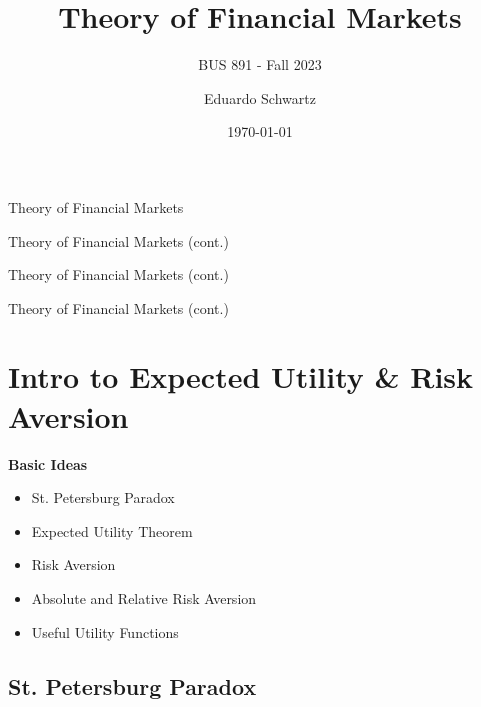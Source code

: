 \documentclass[
14pt,notheorems,hyperref={pdfauthor=whatever}
]{beamer}
\title[
]{Theory of Financial Markets}
\subtitle{BUS 891 - Fall 2023}
\author[
]{
    Eduardo Schwartz 
}
\institute{
    Ryan Beedie Chair in Finance, \\
    Simon Fraser University}
\date{\today}
\begin{document}
{
\begin{frame}
  \titlepage
\end{frame}
}
\addtocounter{framenumber}{-1}

\begin{frame}{Theory of Financial Markets}
    \setcounter{tocdepth}{2}
        \tableofcontents[sections={1-4}]
\end{frame}
\begin{frame}{Theory of Financial Markets (cont.)}
    \setcounter{tocdepth}{2}
        \tableofcontents[sections={5-9}]
\end{frame}
\begin{frame}{Theory of Financial Markets (cont.)}
    \setcounter{tocdepth}{2}
        \tableofcontents[sections={10-14}]
\end{frame}
\begin{frame}{Theory of Financial Markets (cont.)}
    \setcounter{tocdepth}{2}
        \tableofcontents[sections={15-20}]
        \vspace{166px}
\end{frame}

\section{Intro to Expected Utility \& Risk Aversion}
\begin{frame}
\alert{\textbf{Basic Ideas}}
\begin{itemize}
    \item St. Petersburg Paradox
    \item Expected Utility Theorem
    \item Risk Aversion
    \item Absolute and Relative Risk Aversion
    \item Useful Utility Functions
\end{itemize} 
\end{frame}


\subsection{St. Petersburg Paradox}
\end{document}
